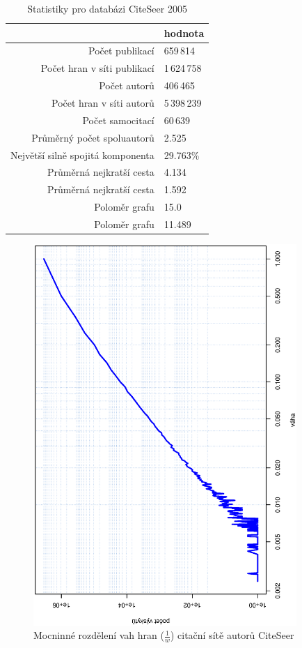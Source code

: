 \documentclass{bakalarka}
\begin{document}
\begin{table}[!ht]
\centering
\caption{Statistiky pro databázi CiteSeer 2005}
\label{tab:citeseerstat}
\begin{tabular}{r|l}
\toprule
& hodnota \\
\midrule
Počet publikací & 659\,814 \\
Počet hran v síti publikací & 1\,624\,758 \\
Počet autorů & 406\,465 \\
Počet hran v síti autorů & 5\,398\,239 \\
Počet samocitací & 60\,639 \\
Průměrný počet spoluautorů & 2.525 \\
Největší silně spojitá komponenta & 29.763\% \\
Průměrná nejkratší cesta\footnotemark[1] & 4.134 \\
Průměrná nejkratší cesta\footnotemark[2] & 1.592 \\
Poloměr grafu\footnotemark[1] & 15.0   \\
Poloměr grafu\footnotemark[2] & 11.489 \\
\bottomrule
\end{tabular}
\end{table}

\begin{figure}[!ht]
\centering
	\includegraphics[width=10cm,angle=270]{ewd_citeseer.eps}
	\caption{Mocninné rozdělení vah hran ($\frac{1}{w}$) citační sítě autorů CiteSeer}
	\label{fig:scalefreeciteseer}
\end{figure}
\end{document}
